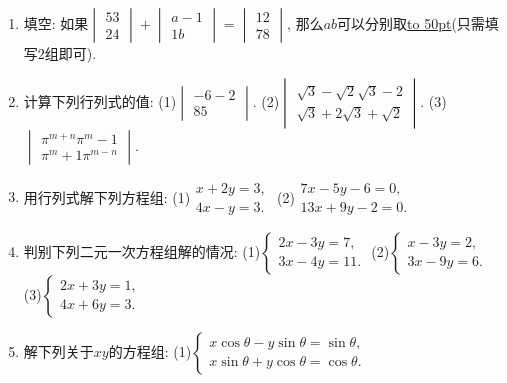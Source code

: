 \documentclass[10pt,a4paper]{article}
\newcommand{\blank}[1]{\underline{\hbox to #1pt{}}}
\begin{document}
\begin{enumerate}[1.]
\item 填空:
如果$\begin{vmatrix}
    5  3  \\2  4  \end{vmatrix}+\begin{vmatrix}
    a  -1  \\1  b  \end{vmatrix}=\begin{vmatrix}
    1  2  \\7  8  \end{vmatrix}$, 那么$ab$可以分别取\blank{50}(只需填写$2$组即可).
\item 计算下列行列式的值:
(1)$\begin{vmatrix}
    -6  -2  \\8  5  \end{vmatrix}$. (2)$\begin{vmatrix}
    \sqrt 3-\sqrt 2  \sqrt 3-2  \\\sqrt 3+2  \sqrt 3+\sqrt 2  \end{vmatrix}$.
(3)$\begin{vmatrix}
    \pi ^{m+n}  \pi ^m-1  \\\pi ^m+1  \pi ^{m-n}  \end{vmatrix}$.
\item 用行列式解下列方程组:
(1)$\begin{matrix}
    x+2y=3,  \\4x-y=3.  \end{matrix}$ (2)$\begin{matrix}
    7x-5y-6=0,  \\13x+9y-2=0.  \end{matrix}$
\item 判别下列二元一次方程组解的情况:
(1)$\begin{cases}
    2x-3y=7,  \\3x-4y=11.  \end{cases}$ (2)$\begin{cases}
    x-3y=2,  \\3x-9y=6.  \end{cases}$
(3)$\begin{cases}
    2x+3y=1,  \\4x+6y=3.  \end{cases}$
\item 解下列关于$xy$的方程组:
(1)$\begin{cases}
    x\cos \theta -y\sin \theta =\sin \theta ,  \\x\sin \theta +y\cos \theta =\cos \theta .  \end{cases}$

\end{enumerate}
\end{document}
